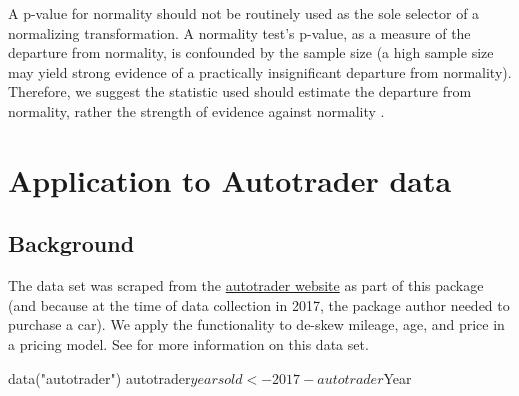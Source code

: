 \begin{Schunk}
\end{Schunk}

A p-value for normality should not be routinely used as the sole
selector of a normalizing transformation. A normality test's p-value, as
a measure of the departure from normality, is confounded by the sample
size (a high sample size may yield strong evidence of a practically
insignificant departure from normality). Therefore, we suggest the
statistic used should estimate the departure from normality, rather the
strength of evidence against normality \citep[e.g.,][]{normality}.

\hypertarget{application-to-autotrader-data}{%
\section{Application to Autotrader
data}\label{application-to-autotrader-data}}

\hypertarget{background}{%
\subsection{Background}\label{background}}

The  data set was scraped from the
\href{https://www.autotrader.com/}{autotrader website} as part of this
package (and because at the time of data collection in 2017, the package
author needed to purchase a car). We apply the 
functionality to de-skew mileage, age, and price in a pricing model. See
 for more information on this data set.

\begin{Schunk}
\begin{Sinput}
data("autotrader")
autotrader$yearsold <- 2017 - autotrader$Year
\end{Sinput}
\end{Schunk}

